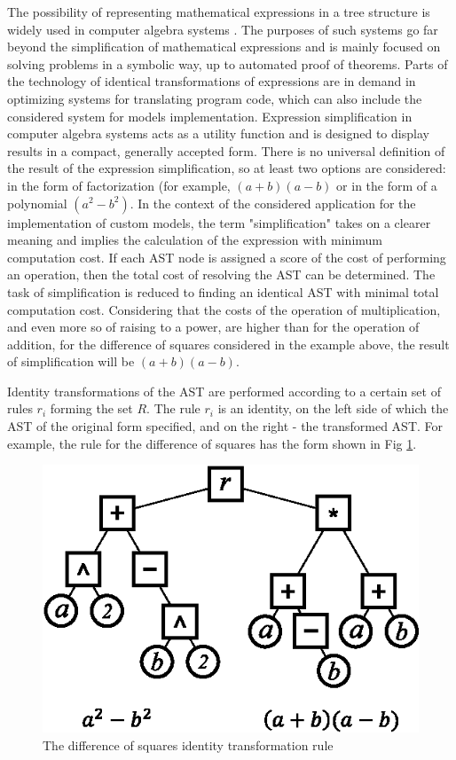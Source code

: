\documentclass[lettersize,journal]{IEEEtran}
\begin{document}
The possibility of representing mathematical expressions in a tree structure is widely used in computer algebra systems \cite{gathen13}. 
The purposes of such systems go far beyond the simplification of mathematical expressions and is mainly focused on solving problems in a symbolic way,
up to automated proof of theorems. Parts of the technology of identical transformations of expressions are in demand in optimizing systems for translating program
code, which can also include the considered system for models implementation. Expression simplification in computer algebra systems acts as a utility function 
and is designed to display results in a compact, generally accepted form. There is no universal definition of the result of the expression simplification, so at
least two options are considered: in the form of factorization (for example, \((a+b)(a-b)\) or in the form of a polynomial \((a ^ 2-b ^ 2)\). In the context of 
the considered application for the implementation of custom models, the term "simplification" takes on a clearer meaning and implies the calculation of the
expression with minimum computation cost. If each AST node is assigned a score of the cost of performing an operation, then the total cost of resolving the AST 
can be determined. The task of simplification is reduced to finding an identical AST with minimal total computation cost. Considering that the costs of 
the operation of multiplication, and even more so of raising to a power, are higher than for the operation of addition, for the difference of squares 
considered in the example above, the result of simplification will be \((a+b)(a-b)\).

Identity transformations of the AST are performed according to a certain set of rules \(r_i\) forming the set \(R\). The rule \(r_i\) is an identity, 
on the left side of which the AST of the original form specified, and on the right - the transformed AST. For example, the rule for the difference of squares has the form shown in Fig \ref{fig_simpl}.

\begin{figure}[h]
	\centering
	\includegraphics[width=.7\columnwidth]{simplification.eps}
	\caption{The difference of squares identity transformation rule}
	\label{fig_simpl}
\end{figure}
\end{document}
